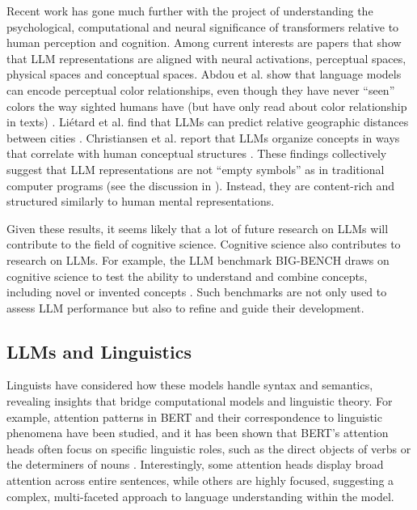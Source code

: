 Recent work has gone much further with the project of understanding the psychological, computational and neural significance of transformers relative to human perception and cognition. Among current interests are papers that show that LLM representations are aligned with neural activations,  perceptual spaces, physical spaces and conceptual spaces. Abdou et al. show that language models can encode perceptual color relationships, even though they have never ``seen'' colors the way sighted humans have (but have only read about color relationship in texts) \cite{abdou2021can}. Liétard et al. find that LLMs can predict relative geographic distances between cities \cite{lietard2021do}. Christiansen et al. report that LLMs organize concepts in ways that correlate with human conceptual structures \cite{christiansen2023large}. These findings collectively suggest that LLM representations are not ``empty symbols'' as in traditional computer programs (see the discussion in ). Instead, they are content-rich and structured similarly to human mental representations.

Given these results, it seems likely that a lot of future research on LLMs will contribute to the field of cognitive science. Cognitive science also contributes to research on LLMs. For example, the LLM benchmark BIG-BENCH draws on cognitive science to test the ability to understand and combine concepts, including novel or invented concepts \cite{srivastava2022beyond}. Such benchmarks are not only used to assess LLM performance but also to refine and guide their development. 

\subsection{LLMs and Linguistics}

Linguists have considered how these models handle syntax and semantics, revealing insights that bridge computational models and linguistic theory. For example, attention patterns in BERT and their correspondence to linguistic phenomena have been studied, and it has been shown that BERT's attention heads often focus on specific linguistic roles, such as the direct objects of verbs or the determiners of nouns \cite{clark2019does}. Interestingly, some attention heads display broad attention across entire sentences, while others are highly focused, suggesting a complex, multi-faceted approach to language understanding within the model. 

